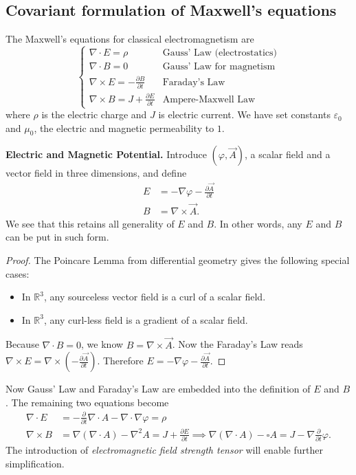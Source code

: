 \subsection{Covariant formulation of Maxwell's equations}
\label{sec:covariant-maxwell}

The Maxwell's equations for classical electromagnetism are
\begin{equation*}
	\begin{cases}
		\nabla \cdot E = \rho & \text{Gauss' Law (electrostatics)}\\
		\nabla  \cdot B = 0 & \text{Gauss' Law for magnetism}\\
		\nabla  \times E = - \frac{\partial B}{\partial t} & \text{Faraday's Law}\\
		\nabla  \times  B = J + \frac{\partial E}{\partial t}  & \text{Ampere-Maxwell Law}
	\end{cases}
\end{equation*}
where $\rho$ is the electric charge and $J$ is electric current. We have set constants $\varepsilon_0$ and $\mu_0$, the electric and magnetic permeability to $1$.

\textbf{Electric and Magnetic Potential.} Introduce  $(\varphi, \vec{A} )$, a scalar field and a vector field in three dimensions, and define
\begin{align*}
	E &=  - \nabla \varphi - \frac{\partial \vec{A} }{\partial t}  \\
	B &= \nabla \times \vec{A} 
.\end{align*}
We see that this retains all generality of $E$ and $B$. In other words, any $E$ and $B$ can be put in such form.
\begin{proof}
	The Poincare Lemma from differential geometry gives the following special cases:
	\begin{itemize}
		\item In $\mathbb{R}^3$, any sourceless vector field is a curl of a scalar field.
		\item In $\mathbb{R}^3$, any curl-less field is a gradient of a scalar field.
	\end{itemize}
	Because $\nabla  \cdot B = 0$, we know  $B = \nabla  \times \vec{A} $. Now the Faraday's Law reads $\nabla \times E = \nabla \times (- \frac{\partial \vec{A} }{\partial t} )$. Therefore $E = - \nabla  \varphi - \frac{\partial \vec{A} }{\partial t} $.
\end{proof}

Now Gauss' Law and Faraday's Law are embedded into the definition of $E$ and $B$. The remaining two equations become
\begin{align*}
	\nabla \cdot E &= - \frac{\partial }{\partial t}  \nabla  \cdot A - \nabla  \cdot  \nabla \varphi = \rho\\
	\nabla \times B &= \nabla (\nabla \cdot A) - \nabla ^2 A = J + \frac{\partial E}{\partial t} \implies \nabla (\nabla  \cdot A) - \square A = J - \nabla  \frac{\partial }{\partial t} \varphi
.\end{align*}
The introduction of \textit{electromagnetic field strength tensor} will enable further simplification.

